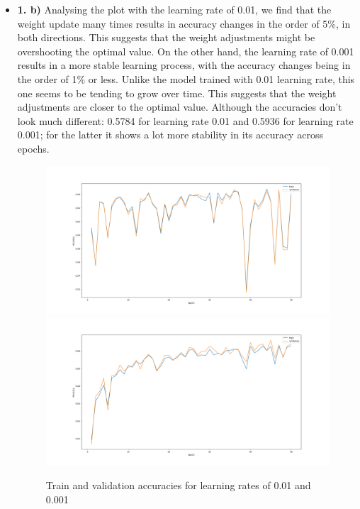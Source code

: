 \documentclass[12pt]{article}
\begin{document}
\begin{itemize}
    \item \textbf{1. b)} Analysing the plot with the learning rate of 0.01, we find that the weight update many times results in accuracy changes in the order of 5\%, in both directions. This suggests that the weight adjustments might be overshooting the optimal value. On the other hand, the learning rate of 0.001 results in a more stable learning process, with the accuracy changes being in the order of 1\% or less. Unlike the model trained with 0.01 learning rate, this one seems to be tending to grow over time. This suggests that the weight adjustments are closer to the optimal value. Although the accuracies don't look much different: 0.5784 for learning rate 0.01 and 0.5936 for learning rate 0.001; for the latter it shows a lot more stability in its accuracy across epochs.
          \begin{figure}[H]
              \centering
              \includegraphics[width=1\linewidth]{../outputs/hw1-q1-1b.01.png}
              \includegraphics[width=1\linewidth]{../outputs/hw1-q1-1b.001.png}
              \caption{Train and validation accuracies for learning rates of 0.01 and 0.001}
              \label{fig:1.1b}
          \end{figure}

\end{itemize}
\end{document}

